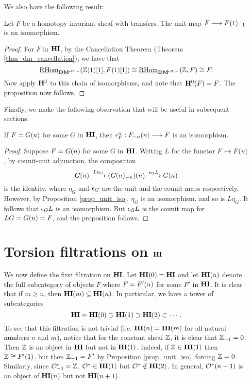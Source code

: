 We also have the following result:

\begin{prop}\label{prop_unit_iso}
Let $F$ be a homotopy invariant sheaf with transfers. The unit map 
$F \to \RHI{\LHI{F}}$ is an isomorphism.
\end{prop}
\begin{proof}
For $F$ in $\HI$, by the Cancellation Theorem 
(Theorem \ref{thm_dm_cancellation}), we have that 
\[
\ihomDMf(\Z(1)[1], F(1)[1]) \cong \ihomDMf(\Z, F) 
\cong F. 
\]
Now apply $\HH^0$ to this chain of isomorphisms, and note 
that $\HH^0(F) = F$. The proposition now follows.
\end{proof}

Finally, we make the following observation that will be useful
in subsequent sections.

\begin{prop}\label{prop_counit_iso_for_HIn}
If $F = \LHI[n]{G}$ for some $G$ in $\HI$, then $\cuHI^n_F : 
\LHI[n]{\RHI[n]{F}} \to F$ is an isomorphism.
\end{prop}
\begin{proof}
Suppose $F = \LHI[n]{G}$ for some $G$ in $\HI$. Writing $L$ for 
the functor 
$F \mapsto \LHI[n]F$, by counit-unit adjunction, the composition
\[
\LHI[n]{G} \xrightarrow{L\eta_G} \LHI[n]{(\RHI[n]{\LHI[n]{G}})}
   \xrightarrow{\cuHI_G L} \LHI[n]{G}
\]
is the identity, where $\eta_{G}$ and $\cuHI_{G}$ are the unit and 
the counit maps respectively. However, by Proposition \ref{prop_unit_iso}, 
$\eta_{G}$ is an isomorphism, and so is $L\eta_{G}$. It follows
that $\cuHI_G L$ is an isomorphism. But $\cuHI_G L$ is the counit
map for $LG = \LHI[n]{G} = F$, and the proposition follows.
\end{proof}

\section{Torsion filtrations on $\HI$}

We now define the first filtration on $\HI$. Let $\LHI[0]{\HI} = 
\HI$ and let $\LHI[n]{\HI}$ denote the full subcategory of objects 
$F$ where $F = \LHI[n]{F'}$ for some $F'$ in $\HI$. It is clear 
that if $m \geq n$, then $\LHI[m]{\HI} \subseteq \LHI[n]{\HI}$. 
In particular, we have a tower of subcategories
\[
\HI = \LHI[0]{\HI} \supset \LHI[1]{\HI} \supset \LHI[2]{\HI} 
\subset \cdots.
\]
To see that this filtration is not trivial (i.e. $\LHI[n]{\HI} =
\LHI[m]{\HI}$ for all natural numbers $n$ and $m$), notice that
for the constant sheaf $\Z$, it is clear that $\RHI{\Z} = 0$. 
Then $\Z$ is an object in $\HI$ but not in $\LHI{\HI}$. Indeed, if 
$\Z \in \LHI{\HI}$ then $\Z \cong \LHI{F'}$, but then $\RHI{\Z} = F'$ 
by Proposition \ref{prop_unit_iso}, forcing $\Z = 0$. Similarly, 
since $\RHI{\Ox} = \Z$, $\Ox \in \LHI{\HI}$ but $\Ox \notin
\LHI[2]{\HI}$. In general, $\LHI[n - 1]{\Ox}$ is an object of
$\LHI[n]{\HI}$ but not $\LHI[n + 1]{\HI}$.

